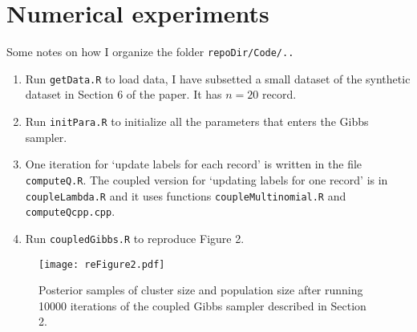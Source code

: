\documentclass[ba]{imsart}
\begin{document}
\begin{comment}
\begin{algorithm}
 \KwIn{Pmfs $\texttt{psampq}_1[]$ and $\texttt{psampq}_2[]$ on $\{1,\ldots, n\}$} 
Calculate $S= \sum_{q=1}^n \texttt{psampq}_1[q] \wedge \texttt{psampq}_1[q] , C[] = \frac{\texttt{psampq}_1[] \wedge \texttt{psampq}_1[]}{S}$, $\texttt{psampq}'_1[]= \frac{\texttt{psampq}_1[] - \texttt{psampq}_1[] \wedge \texttt{psampq}_1[]}{1-S}$, $ \texttt{psampq}'_2[]= \frac{\texttt{psampq}_2[] - \texttt{psampq}_1[] \wedge \texttt{psampq}_1[]}{1-S}$ \;
Sample $U \sim Unif(0,1)$\;
If $U \leq S$, sample \( X^* \sim C[] \) and output \( (X, Y)=(X^*, X^*) \) \;
Else sample independently \( X' \sim \texttt{psampq}'_1[] \), \( Y' \sim \texttt{psampq}'_2[] \) and output \( (X, Y)=(X', Y') \) 
\caption{Maximal coupling of $X \propto  \texttt{psampq}_1$ and $Y \propto \texttt{psampq}_2 $}
 \label{algo:max_coupling}
\end{algorithm}
\end{comment}


\section{Numerical experiments}

Some notes on how I organize the folder \texttt{repoDir/Code/..}
\begin{enumerate}
    \item Run \texttt{getData.R} to load data, I have subsetted a small dataset of the synthetic
    dataset in Section 6 of the paper. It has $n = 20$ record. 
    \item Run \texttt{initPara.R} to initialize all the parameters that enters the Gibbs sampler. 
    \item One iteration for `update labels for each record' is written in the file \texttt{computeQ.R}. The coupled version for `updating labels for one record' is in \texttt{coupleLambda.R} and it uses functions \texttt{coupleMultinomial.R} and \texttt{computeQcpp.cpp}.
    \item Run \texttt{coupledGibbs.R} to reproduce Figure 2. 
\end{enumerate}

\begin{figure}[H]
    \centering
    \texttt{[image: reFigure2.pdf]}
    \caption{Posterior samples of cluster size and population size after running 10000 iterations of the coupled Gibbs sampler described in Section 2.}
    \label{fig:reproduce}
\end{figure}
\end{document}
